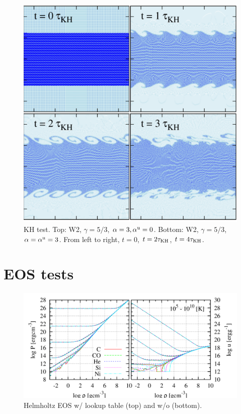 \documentclass[fleqn,dvipdfmx]{article}
\begin{document}
\begin{figure}
  \begin{center}
    \includegraphics[width=14cm,bb=0 0 2120 2000]{fig/kh/draw.png}
  \end{center}
  \caption{KH test. Top: W2, $\gamma=5/3$, $\alpha=3, \alpha^{\rm
      u}=0$. Bottom: W2, $\gamma=5/3$, $\alpha=\alpha^{\rm u}=3$. From
    left to right, $t=0$, $t=2\tau_{\rm KH}$, $t=4\tau_{\rm KH}$.}
\end{figure}

\section{EOS tests}

\begin{figure}
  \begin{center}
    \includegraphics[width=14cm,bb=0 0 980 480]{fig/eos/draw.png}
  \end{center}
  \caption{Helmholtz EOS w/ lookup table (top) and w/o (bottom).}
\end{figure}
\end{document}
